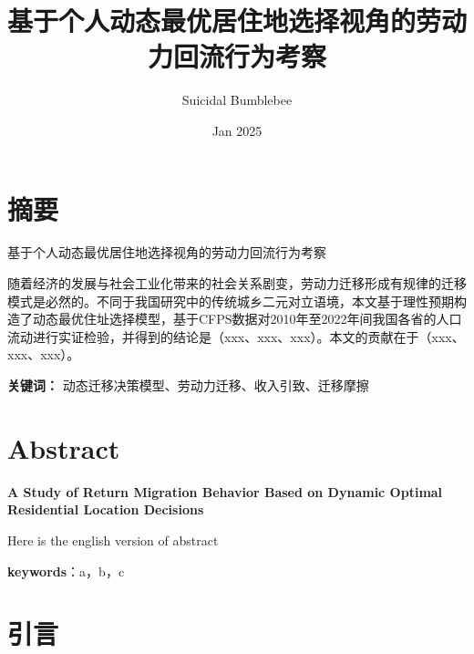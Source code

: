 \documentclass[a4paper,12pt,oneside, fontset=mac]{ctexbook} %
\title{基于个人动态最优居住地选择视角的劳动力回流行为考察}
\author{Suicidal Bumblebee}
\date{Jan 2025}
\begin{document}
\maketitle

\frontmatter
\renewcommand{\thepage}{\Roman{page}} %
\chapter{摘要}

\begin{center}
    基于个人动态最优居住地选择视角的劳动力回流行为考察
\end{center}

随着经济的发展与社会工业化带来的社会关系剧变，劳动力迁移形成有规律的迁移模式是必然的。不同于我国研究中的传统城乡二元对立语境，本文基于理性预期构造了动态最优住址选择模型，基于CFPS数据对2010年至2022年间我国各省的人口流动进行实证检验，并得到的结论是（xxx、xxx、xxx）。本文的贡献在于（xxx、xxx、xxx）。

\textbf{关键词：} 动态迁移决策模型、劳动力迁移、收入引致、迁移摩擦


\chapter{Abstract}

\begin{center}
    \textbf{
    A Study of Return Migration Behavior Based on Dynamic Optimal Residential Location Decisions
    }
\end{center}

Here is the english version of abstract

\textbf{keywords}：a，b，c

\thispagestyle{empty}
\tableofcontents

\mainmatter
\newpage
\chapter{引言}
\end{document}
